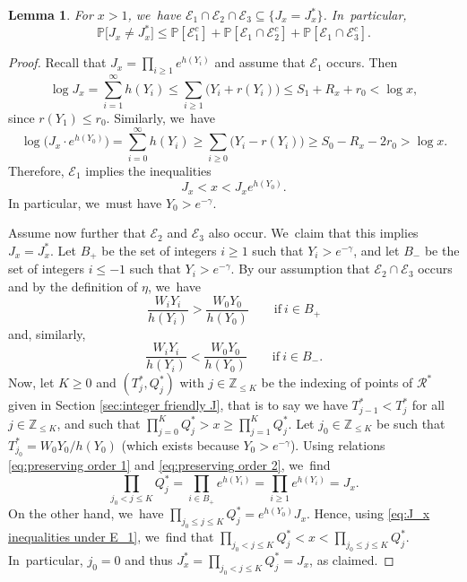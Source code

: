 \documentclass[JEP,XML,SOM,Unicode,published]{cedram}
\newcommand{\ZZ}{\mathbb{Z}}
\newcommand{\PP}{\mathbb{P}}
\newcommand{\EC}{\mathcal{E}}
\newcommand{\RS}{\mathscr{R}}
\newcommand{\bg}{\big}
\theoremstyle{plain}
\newtheorem{lem}[cor]{Lemma}
\theoremstyle{definition}
\begin{document}
\begin{lem}
\label{lem:decomposition J neq J*}
For $x > 1$, we~have $\EC_1\cap \EC_2\cap \EC_3\subseteq \{ J_x = J_x^*\}$. In~particular,
\[
\PP\bg[J_x \ne J_x^*\bg] \le \PP[\EC_1^c] + \PP[\EC_1 \cap \EC_2^c] + \PP[\EC_1 \cap \EC_3^c].
\]
\end{lem}

\begin{proof} Recall that $J_x=\prod_{i\ge1}e^{h(Y_i)}$ and assume that $\mathcal E_1$ occurs. Then
\begin{equation}
\label{eq:e1 implies J < x}
\log J_x = \sum_{i=1}^{\infty} h(Y_i) \le \sum_{i \ge 1} \bg(Y_i + r(Y_i)\bg) \le S_1 + R_x +r_0 < \log x,
\end{equation}
since $r(Y_1)\le r_0$. Similarly, we~have
\[
\log\!\bg(J_x\cdot e^{h(Y_0)}\bg) = \sum_{i=0}^{\infty} h(Y_i) \ge \sum_{i \ge 0} \bg(Y_i - r(Y_i)\bg) \ge S_0 - R_x -2r_0 > \log x.
\]
Therefore, $\EC_1$ implies the inequalities
\begin{equation}
\label{eq:J_x inequalities under E_1}
J_x < x < J_x e^{h(Y_0)}.
\end{equation}
In particular, we~must have $Y_0>e^{-\gamma}$.

Assume now further that $\EC_2$ and $\EC_3$ also occur. We~claim that this implies $J_x = J_x^*$. Let $B_+$ be the set of integers $i \ge 1$ such that $Y_i > e^{-\gamma}$, and let $B_-$ be the set of integers $i\le-1$ such that $Y_i>e^{-\gamma}$.
By our assumption that $\EC_2\cap\EC_3$ occurs and by the definition of $\eta$, we~have
\begin{equation}
\label{eq:preserving order 1}
\frac{W_iY_i}{h(Y_i)} > \frac{W_0Y_0}{h(Y_0)} \qquad\text{if}\ i\in B_+
\end{equation}
and, similarly,
\begin{equation}
\label{eq:preserving order 2}
\frac{W_iY_i}{h(Y_i)} < \frac{W_0Y_0}{h(Y_0)} \qquad\text{if}\ i\in B_-.
\end{equation}
Now, let $K \ge 0$ and $(T_j^*,Q_j^*)$ with $j\in\ZZ_{\le K}$ be the indexing of points of $\RS^*$ given in Section \ref{sec:integer friendly J}, that is to say we have $T_{j-1}^*<T_{j}^*$ for all $j \in \ZZ_{\le K}$, and such that $\prod_{j=0}^K Q_j^*>x \ge \prod_{j=1}^K Q_j^*$. Let $j_0\in\ZZ_{\le K}$ be such that $T_{j_0}^* = W_0Y_0/h(Y_0)$ (which exists because $Y_0>e^{-\gamma}$). Using relations \eqref{eq:preserving order 1} and \eqref{eq:preserving order 2}, we~find
\[
\prod_{j_0 < j \le K} Q_j^*=\prod_{i\in B_+} e^{h(Y_i)} = \prod_{i\ge1} e^{h(Y_i)} = J_x.
\]
On the other hand, we~have $\prod_{j_0 \le j \le K} Q_j^*=e^{h(Y_0)} J_x$. Hence, using \eqref{eq:J_x inequalities under E_1}, we~find that $\prod_{j_0 \!<\! j \!\le\! K}Q_j^*\!<\!x\!<\!\prod_{j_0 \le j \le K}Q_j^*$. In~particular, $j_0\!=\!0$ and thus $J_x^*=\prod_{j_0 < j \le K} Q_j^*\!=\!J_x$, as claimed.
\end{proof}
\end{document}
